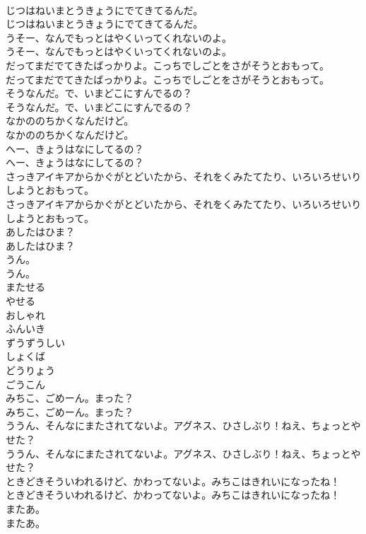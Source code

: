 \documentclass[8pt]{extreport}
\begin{document}
\begin{CJK}{UTF8}{min}
\\	じつはねいまとうきょうにでてきてるんだ。
\\	じつはねいまとうきょうにでてきてるんだ。
\\	うそー、なんでもっとはやくいってくれないのよ。
\\	うそー、なんでもっとはやくいってくれないのよ。
\\	だってまだでてきたばっかりよ。こっちでしごとをさがそうとおもって。
\\	だってまだでてきたばっかりよ。こっちでしごとをさがそうとおもって。
\\	そうなんだ。で、いまどこにすんでるの？
\\	そうなんだ。で、いまどこにすんでるの？
\\	なかののちかくなんだけど。
\\	なかののちかくなんだけど。
\\	へー、きょうはなにしてるの？
\\	へー、きょうはなにしてるの？
\\	さっきアイキアからかぐがとどいたから、それをくみたてたり、いろいろせいりしようとおもって。
\\	さっきアイキアからかぐがとどいたから、それをくみたてたり、いろいろせいりしようとおもって。
\\	あしたはひま？
\\	あしたはひま？
\\	うん。
\\	うん。
\\	またせる
\\	やせる
\\	おしゃれ
\\	ふんいき
\\	ずうずうしい
\\	しょくば
\\	どうりょう
\\	ごうこん
\\	みちこ、ごめーん。まった？
\\	みちこ、ごめーん。まった？
\\	ううん、そんなにまたされてないよ。アグネス、ひさしぶり！ねえ、ちょっとやせた？
\\	ううん、そんなにまたされてないよ。アグネス、ひさしぶり！ねえ、ちょっとやせた？
\\	ときどきそういわれるけど、かわってないよ。みちこはきれいになったね！
\\	ときどきそういわれるけど、かわってないよ。みちこはきれいになったね！
\\	またあ。
\\	またあ。

\end{CJK}
\end{document}
